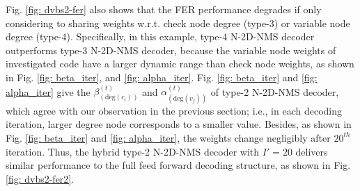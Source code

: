 \documentclass [PhD] {uclathes}
\begin{document}
Fig. \ref{fig: dvbs2-fer} also shows that the FER performance degrades if only considering to sharing weights w.r.t. check node degree (type-3) or variable node degree (type-4). Specifically, in this example, type-4 N-2D-NMS decoder outperforms type-3 N-2D-NMS decoder, because the variable node weights of investigated code have a larger dynamic range than check node weights, as shown in Fig. \ref{fig: beta_iter}, and \ref{fig: alpha_iter}. Fig. \ref{fig: beta_iter} and \ref{fig: alpha_iter} give the $\beta^{(t)}_{(\text{deg}({c_i}))}$ and $\alpha^{(t)}_{(\text{deg}({v_j}))}$ of type-2 N-2D-NMS decoder, which agree with our observation in the previous section; i.e., in each decoding iteration, larger degree node corresponds to a smaller value. Besides, as shown in Fig. \ref{fig: beta_iter} and \ref{fig: alpha_iter}, the  weights change negligibly after $20^{th}$ iteration. Thus, the hybrid type-2 N-2D-NMS decoder with $I'=20$ delivers similar performance to the full feed forward decoding structure, as shown in Fig. \ref{fig: dvbs2-fer2}. 
\end{document}
